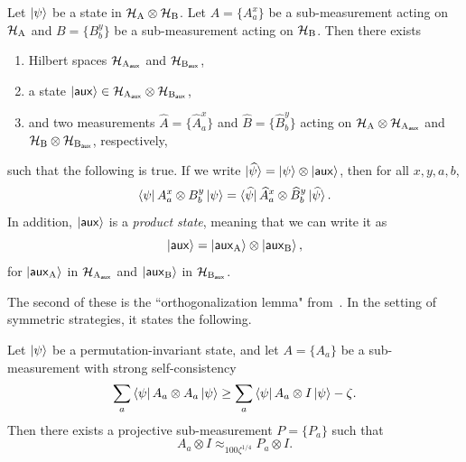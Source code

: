 \begin{theorem}\label{thm:naimark}
Let $\ket{\psi}$ be a state in $\mathcal{H}_{\mathrm{A}} \otimes \mathcal{H}_{\mathrm{B}}$.
Let $A = \{A^x_a\}$ be a sub-measurement acting on $\mathcal{H}_{\mathrm{A}}$
and $B=\{B^y_b\}$ be a sub-measurement acting on $\mathcal{H}_{\mathrm{B}}$.
Then there exists
\begin{enumerate}
\item Hilbert spaces $\mathcal{H}_{\mathrm{A}_{\mathsf{aux}}}$ and $\mathcal{H}_{\mathrm{B}_{\mathsf{aux}}}$,
\item a state $\ket{\mathsf{aux}} \in \mathcal{H}_{\mathrm{A}_{\mathsf{aux}}} \otimes \mathcal{H}_{\mathrm{B}_{\mathsf{aux}}}$,
\item and two measurements  $\widehat{A} = \{\widehat{A}^x_a\}$ and $\widehat{B}=\{\widehat{B}^y_b\}$
acting on $\mathcal{H}_{\mathrm{A}} \otimes \mathcal{H}_{\mathrm{A}_{\mathsf{aux}}}$
and $\mathcal{H}_{\mathrm{B}} \otimes \mathcal{H}_{\mathrm{B}_{\mathsf{aux}}}$,
respectively,
\end{enumerate}
such that the following is true.
If we write $\ket{\widehat{\psi}} = \ket{\psi} \otimes \ket{\mathsf{aux}}$,
then for all $x,y, a, b$,
 \begin{equation*}
 \bra{\psi} A^x_a \otimes B^y_b \ket{\psi}
 = \bra{\widehat{\psi}} \widehat{A}^x_a \otimes \widehat{B}^y_b \ket{\widehat{\psi}}.
 \end{equation*}
 In addition, $\ket{\mathsf{aux}}$ is a \emph{product state},
 meaning that we can write it as
 \begin{equation*}
 \ket{\mathsf{aux}}= \ket{\mathsf{aux}_{\mathrm{A}}} \otimes \ket{\mathsf{aux}_{\mathrm{B}}},
 \end{equation*}
for $\ket{\mathsf{aux}_{\mathrm{A}}}$ in $\mathcal{H}_{\mathrm{A}_{\mathsf{aux}}}$
and $\ket{\mathsf{aux}_{\mathrm{B}}}$ in $\mathcal{H}_{\mathrm{B}_{\mathsf{aux}}}$.
\end{theorem}
The second of these is the ``orthogonalization lemma" from~\cite{KV11}.
In the setting of symmetric strategies, it states the following.

\begin{theorem}\label{thm:orthonormalization}
Let $\ket{\psi}$ be a permutation-invariant state,
and let $A = \{A_a\}$ be a sub-measurement with strong self-consistency
\begin{equation*}
\sum_a \bra{\psi} A_a \otimes A_a \ket{\psi} \geq \sum_a \bra{\psi} A_a \otimes I \ket{\psi} -\zeta.
\end{equation*}
Then there exists a projective sub-measurement $P = \{P_a\}$ such that
\begin{equation*}
A_a \otimes I \approx_{100 \zeta^{1/4}} P_a \otimes I.
\end{equation*}
\end{theorem}

